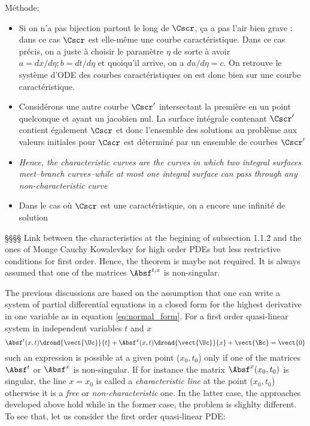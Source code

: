 Méthode:
\begin{itemize}
\item Si on n'a pas bijection partout le long de $\Cscr$, ça a pas l'air bien grave : dans ce cas $\Cscr$ est elle-même une courbe caractéristique. Dans ce cas précis, on a juste à choisir le paramètre $\eta$ de sorte à avoir $a=dx/d\eta ; b=dt/d\eta$ et quoiqu'il arrive, on a $du/d\eta=c$. On retrouve le système d'ODE des courbes caractéristiques on est donc bien sur une courbe caractéristique.
\item Considérons une autre courbe $\Cscr'$ intersectant la première en un point quelconque et ayant un jacobien nul. La surface intégrale contenant $\Cscr'$ contient également $\Cscr$ et donc l'ensemble des solutions au problème aux valeurs initiales pour $\Cscr$ est déterminé par un ensemble de courbes $\Cscr'$
\item \textit{Hence, the characteristic curves are the curves in which two integral surfaces meet--branch curves--while at most one integral surface can pass through any non-characteristic curve}
\item Dans le cas où $\Cscr$ est une caractéristique, on a encore une infinité de solution
\end{itemize}

§§§§ Link between the characteristics at the begining of subsection 1.1.2 and the ones of Monge
Cauchy Kowalevksy for high order PDEs but less restrictive conditions for first order. Hence, the theorem is maybe not required.  It is always assumed that one of the matrices $\Absf^{t,x}$ is non-singular.

The previous discussions are based on the assumption that one can write a system of partial differential equations in a closed form for the highest derivative in one variable as in equation \eqref{eq:normal_form}. For a first order quasi-linear system in independent variables $t$ and $x$
\begin{equation}
  \label{eq:1st_order_quasilinear_syst}
  \Absf^t(x,t)\drond{\vect{\Uc}}{t} + \Absf^x(x,t) \drond{\vect{\Uc}}{x} + \vect{\Bc} = \vect{0}
\end{equation}
such an expression is possible at a given point ($x_0,t_0$) only if one of the matrices $\Absf^t$ or $\Absf^x$ is non-singular. If for instance the matrix $\Absf^x(x_0,t_0)$ is singular, the line $x=x_0$ is called a \textit{characteristic line} at the point ($x_0,t_0$) otherwise it is a \textit{free} or \textit{non-characteristic} one. In the latter case, the approaches developed above hold while in the former case, the problem is slighlty different. To see that, let us consider the first order quasi-linear PDE:

